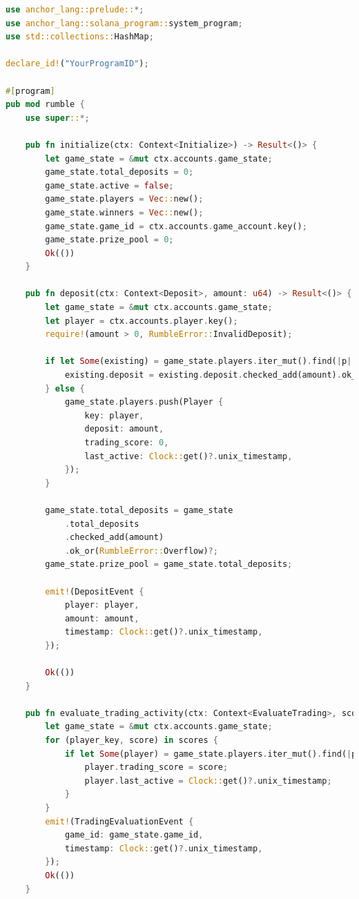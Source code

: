 \documentclass[11pt,a4paper]{article}
\begin{document}
\begin{lstlisting}[language=Rust, caption={Solana Smart Contract for RUMBLE}]
use anchor_lang::prelude::*;
use anchor_lang::solana_program::system_program;
use std::collections::HashMap;

declare_id!("YourProgramID");

#[program]
pub mod rumble {
    use super::*;

    pub fn initialize(ctx: Context<Initialize>) -> Result<()> {
        let game_state = &mut ctx.accounts.game_state;
        game_state.total_deposits = 0;
        game_state.active = false;
        game_state.players = Vec::new();
        game_state.winners = Vec::new();
        game_state.game_id = ctx.accounts.game_account.key();
        game_state.prize_pool = 0;
        Ok(())
    }

    pub fn deposit(ctx: Context<Deposit>, amount: u64) -> Result<()> {
        let game_state = &mut ctx.accounts.game_state;
        let player = ctx.accounts.player.key();
        require!(amount > 0, RumbleError::InvalidDeposit);

        if let Some(existing) = game_state.players.iter_mut().find(|p| p.key == player) {
            existing.deposit = existing.deposit.checked_add(amount).ok_or(RumbleError::Overflow)?;
        } else {
            game_state.players.push(Player {
                key: player,
                deposit: amount,
                trading_score: 0,
                last_active: Clock::get()?.unix_timestamp,
            });
        }

        game_state.total_deposits = game_state
            .total_deposits
            .checked_add(amount)
            .ok_or(RumbleError::Overflow)?;
        game_state.prize_pool = game_state.total_deposits;

        emit!(DepositEvent {
            player: player,
            amount: amount,
            timestamp: Clock::get()?.unix_timestamp,
        });

        Ok(())
    }

    pub fn evaluate_trading_activity(ctx: Context<EvaluateTrading>, scores: Vec<(Pubkey, u32)>) -> Result<()> {
        let game_state = &mut ctx.accounts.game_state;
        for (player_key, score) in scores {
            if let Some(player) = game_state.players.iter_mut().find(|p| p.key == player_key) {
                player.trading_score = score;
                player.last_active = Clock::get()?.unix_timestamp;
            }
        }
        emit!(TradingEvaluationEvent {
            game_id: game_state.game_id,
            timestamp: Clock::get()?.unix_timestamp,
        });
        Ok(())
    }


\end{lstlisting}
\end{document}

